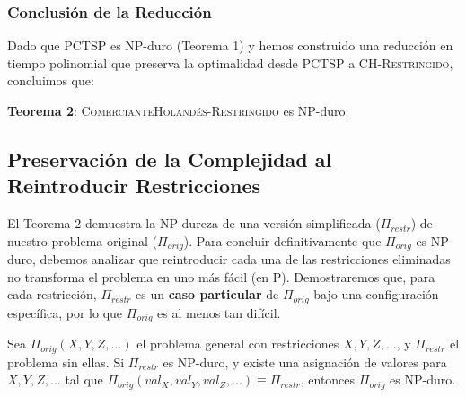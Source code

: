 \documentclass{article}
\begin{document}
\subsubsection*{Conclusión de la Reducción} 
Dado que PCTSP es NP-duro (Teorema 1) y hemos construido una reducción en tiempo polinomial que preserva la optimalidad desde PCTSP a \textsc{CH-Restringido}, concluimos que:

\textbf{Teorema 2}: \textsc{ComercianteHolandés-Restringido} es NP-duro.

\subsection{Preservación de la Complejidad al Reintroducir Restricciones}
\label{subsec:preservacion_complejidad}

El Teorema 2 demuestra la NP-dureza de una versión simplificada ($\Pi_{restr}$) de nuestro problema original ($\Pi_{orig}$). Para concluir definitivamente que $\Pi_{orig}$ es NP-duro, debemos analizar que reintroducir cada una de las restricciones eliminadas no transforma el problema en uno más fácil (en P). Demostraremos que, para cada restricción, $\Pi_{restr}$ es un \textbf{caso particular} de $\Pi_{orig}$ bajo una configuración específica, por lo que $\Pi_{orig}$ es al menos tan difícil.

Sea $\Pi_{orig}(X, Y, Z, ...)$ el problema general con restricciones $X, Y, Z, ...$, y $\Pi_{restr}$ el problema sin ellas. Si $\Pi_{restr}$ es NP-duro, y existe una asignación de valores para $X, Y, Z, ...$ tal que $\Pi_{orig}(val_X, val_Y, val_Z, ...) \equiv \Pi_{restr}$, entonces $\Pi_{orig}$ es NP-duro.
\end{document}
